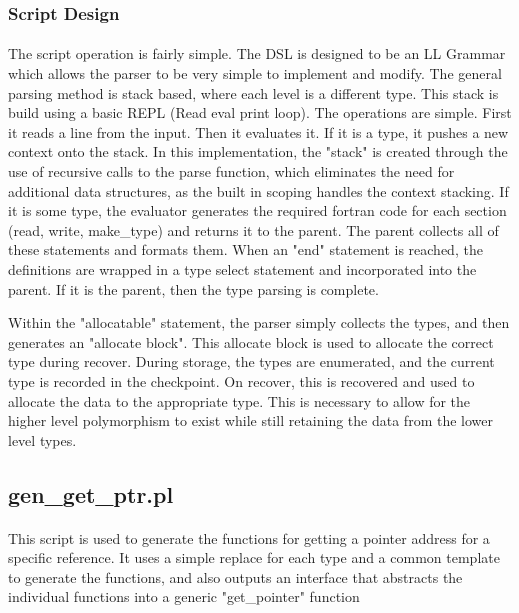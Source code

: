 \documentclass{article}
\begin{document}
\subsubsection{Script Design}
\paragraph{}
The script operation is fairly simple. The DSL is designed to be an LL Grammar which allows the parser to be very simple to implement and modify. The general parsing method is stack based, where each level is a different type. This stack is build using a basic REPL (Read eval print loop). The operations are simple. First it reads a line from the input. Then it evaluates it. If it is a type, it pushes a new context onto the stack. In this implementation, the "stack" is created through the use of recursive calls to the parse function, which eliminates the need for additional data structures, as the built in scoping handles the context stacking. If it is some type, the evaluator generates the required fortran code for each section (read, write, make\_type) and returns it to the parent. The parent collects all of these statements and formats them. When an "end" statement is reached, the definitions are wrapped in a type select statement and incorporated into the parent. If it is the parent, then the type parsing is complete.

Within the "allocatable" statement, the parser simply collects the types, and then generates an "allocate block". This allocate block is used to allocate the correct type during recover. During storage, the types are enumerated, and the current type is recorded in the checkpoint. On recover, this is recovered and used to allocate the data to the appropriate type. This is necessary to allow for the higher level polymorphism to exist while still retaining the data from the lower level types.

\subsection{gen\_get\_ptr.pl}
\paragraph{}
This script is used to generate the functions for getting a pointer address for a specific reference. It uses a simple replace for each type and a common template to generate the functions, and also outputs an interface that abstracts the individual functions into a generic "get\_pointer" function
\end{document}
